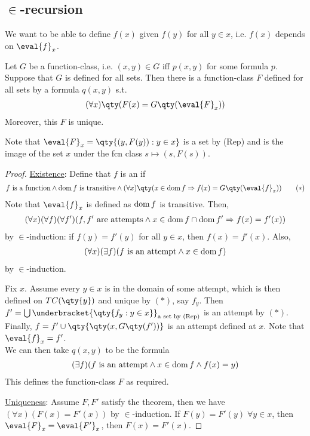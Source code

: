 \subsection{\texorpdfstring{$\in$}{∈}-recursion}
We want to be able to define $f(x)$ given $f(y)$ for all $y \in x$, i.e. $f(x)$ depends on $\eval{f}_x$.

\begin{theorem}
    Let $G$ be a function-class, i.e. $(x,y) \in G$ iff $p(x,y)$ for some formula $p$.
    Suppose that $G$ is defined for all sets.
    Then there is a function-class $F$ defined for all sets by a formula $q(x,y)$ s.t.
    \begin{align*}
        (\forall x)\qty(F(x) = G\qty(\eval{F}_x))
    \end{align*}
    Moreover, this $F$ is unique.
\end{theorem}

Note that $\eval{F}_x = \qty{(y, F(y)) : y \in x}$ is a set by (Rep) and is the image of the set $x$ under the fcn class $s \mapsto (s, F(s))$.

\begin{proof}
    \underline{Existence}:
    Define that $f$ is an  if
    \begin{align*}
        f \text{ is a function} \wedge \dom f \text{ is transitive} \wedge (\forall x)\qty(x \in \dom f \implies f(x) = G\qty(\eval{f}_x)) \tag{$\ast$}
    \end{align*}
    Note that $\eval{f}_x$ is defined as $\operatorname{dom} f$ is transitive.
    Then,
    \begin{align*}
        (\forall x)(\forall f)(\forall f')(f, f' \text{ are attempts} \wedge x \in \operatorname{dom} f \cap \operatorname{dom} f' \Rightarrow f(x) = f'(x))
    \end{align*}
    by $\in$-induction: if $f(y) = f'(y)$ for all $y \in x$, then $f(x) = f'(x)$.
    Also,
    \begin{align*}
        (\forall x)(\exists f)(f \text{ is an attempt} \wedge x \in \operatorname{dom} f)
    \end{align*}
    by $\in$-induction.

    Fix $x$.
    Assume every $y \in x$ is in the domain of some attempt, which is then defined on $TC(\qty{y})$ and unique by $(\ast)$, say $f_y$.
    Then $f' = \bigcup \underbracket{\qty{f_y : y \in x}}_{\text{a set by (Rep)}}$ is an attempt by $(\ast)$.
    Finally, $f = f' \cup \qty{\qty(x, G\qty(f'))}$ is an attempt defined at $x$.
    Note that $\eval{f}_x = f'$. \\
    We can then take $q(x,y)$ to be the formula
    \begin{align*}
        (\exists f)(f \text{ is an attempt} \wedge x \in \operatorname{dom} f \wedge f(x) = y)
    \end{align*}
    This defines the function-class $F$ as required.

    \underline{Uniqueness}: Assume $F, F'$ satisfy the theorem, then we have $(\forall x)(F(x) = F'(x))$ by $\in$-induction.
    If $F(y) = F'(y) \; \forall y \in x$, then $\eval{F}_x = \eval{F'}_x$, then $F(x) = F'(x)$.
\end{proof}

